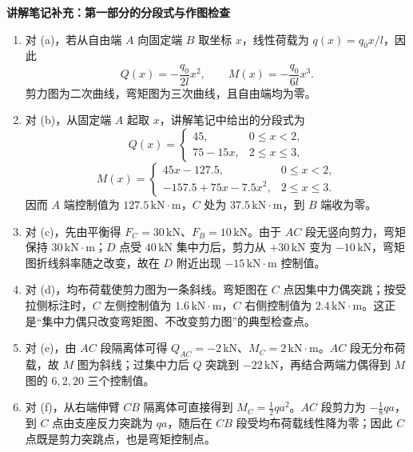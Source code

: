 \begin{notecard}
\textbf{讲解笔记补充：第一部分的分段式与作图检查}

\begin{enumerate}
  \item 对 (a)，若从自由端 \(A\) 向固定端 \(B\) 取坐标 \(x\)，线性荷载为 \(q(x)=q_0x/l\)，因此
  \[
    Q(x)=-\frac{q_0}{2l}x^2,\qquad
    M(x)=-\frac{q_0}{6l}x^3.
  \]
  剪力图为二次曲线，弯矩图为三次曲线，且自由端均为零。

  \item 对 (b)，从固定端 \(A\) 起取 \(x\)，讲解笔记中给出的分段式为
  \[
    Q(x)=
    \begin{cases}
      45, & 0\le x<2,\\
      75-15x, & 2\le x\le3,
    \end{cases}
  \]
  \[
    M(x)=
    \begin{cases}
      45x-127.5, & 0\le x<2,\\
      -157.5+75x-7.5x^2, & 2\le x\le3.
    \end{cases}
  \]
  因而 \(A\) 端控制值为 \(127.5\,\mathrm{kN\cdot m}\)，\(C\) 处为 \(37.5\,\mathrm{kN\cdot m}\)，到 \(B\) 端收为零。

  \item 对 (c)，先由平衡得 \(F_C=30\,\mathrm{kN}\)、\(F_B=10\,\mathrm{kN}\)。由于 \(AC\) 段无竖向剪力，弯矩保持 \(30\,\mathrm{kN\cdot m}\)；\(D\) 点受 \(40\,\mathrm{kN}\) 集中力后，剪力从 \(+30\,\mathrm{kN}\) 变为 \(-10\,\mathrm{kN}\)，弯矩图折线斜率随之改变，故在 \(D\) 附近出现 \(-15\,\mathrm{kN\cdot m}\) 控制值。

  \item 对 (d)，均布荷载使剪力图为一条斜线。弯矩图在 \(C\) 点因集中力偶突跳；按受拉侧标注时，\(C\) 左侧控制值为 \(1.6\,\mathrm{kN\cdot m}\)，\(C\) 右侧控制值为 \(2.4\,\mathrm{kN\cdot m}\)。这正是“集中力偶只改变弯矩图、不改变剪力图”的典型检查点。

  \item 对 (e)，由 \(AC\) 段隔离体可得 \(Q_{AC}=-2\,\mathrm{kN}\)、\(M_C=2\,\mathrm{kN\cdot m}\)。\(AC\) 段无分布荷载，故 \(M\) 图为斜线；过集中力后 \(Q\) 突跳到 \(-22\,\mathrm{kN}\)，再结合两端力偶得到 \(M\) 图的 \(6,2,20\) 三个控制值。

  \item 对 (f)，从右端伸臂 \(CB\) 隔离体可直接得到 \(M_C=\frac12qa^2\)。\(AC\) 段剪力为 \(-\frac18qa\)，到 \(C\) 点由支座反力突跳为 \(qa\)，随后在 \(CB\) 段受均布荷载线性降为零；因此 \(C\) 点既是剪力突跳点，也是弯矩控制点。
\end{enumerate}
\end{notecard}

